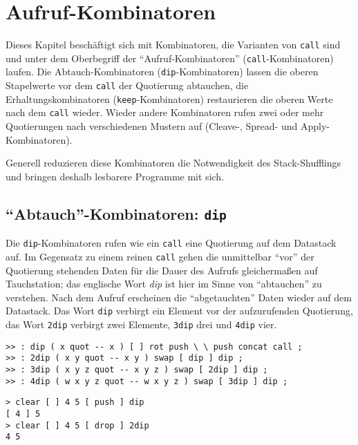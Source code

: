 \section{Aufruf-Kombinatoren}
\label{Sec:Kombinatoren}

Dieses Kapitel beschäftigt sich mit Kombinatoren, die Varianten von \verb|call| sind und unter dem Oberbegriff der "`Aufruf-Kombinatoren"' (\verb|call|-Kombinatoren) laufen. Die Abtauch-Kombinatoren (\verb|dip|-Kombinatoren) lassen die oberen Stapelwerte vor dem \verb|call| der Quotierung abtauchen, die Erhaltungskombinatoren (\verb|keep|-Kombinatoren) restaurieren die oberen Werte nach dem \verb|call| wieder. Wieder andere Kombinatoren rufen zwei oder mehr Quotierungen nach verschiedenen Mustern auf (Cleave-, Spread- und Apply-Kombinatoren).

Generell reduzieren diese Kombinatoren die Notwendigkeit des Stack-Shufflings und bringen deshalb lesbarere Programme mit sich. 

\subsection{"`Abtauch"'-Kombinatoren: \texttt{dip}}\label{Sec:dip}

Die \verb|dip|-Kombinatoren rufen wie ein \verb|call| eine Quotierung auf dem Datastack auf. Im Gegensatz zu einem reinen \verb|call| gehen die unmittelbar "`vor"' der Quotierung stehenden Daten für die Dauer des Aufrufs gleichermaßen auf Tauchstation; das englische Wort \emph{dip} ist hier im Sinne von "`abtauchen"' zu verstehen. Nach dem Aufruf erscheinen die "`abgetauchten"' Daten wieder auf dem Datastack. Das Wort \verb|dip| verbirgt ein Element vor der aufzurufenden Quotierung, das Wort \verb|2dip| verbirgt zwei Elemente, \verb|3dip| drei und \verb|4dip| vier.

\begin{verbatim}
>> : dip ( x quot -- x ) [ ] rot push \ \ push concat call ;
>> : 2dip ( x y quot -- x y ) swap [ dip ] dip ;
>> : 3dip ( x y z quot -- x y z ) swap [ 2dip ] dip ;
>> : 4dip ( w x y z quot -- w x y z ) swap [ 3dip ] dip ;
\end{verbatim}

\begin{verbatim}
> clear [ ] 4 5 [ push ] dip
[ 4 ] 5
> clear [ ] 4 5 [ drop ] 2dip
4 5
\end{verbatim}

